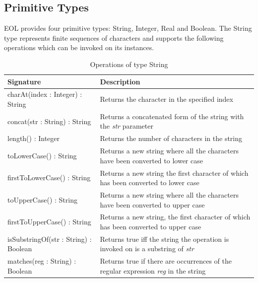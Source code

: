 \subsection{Primitive Types} 

EOL provides four primitive types: String, Integer, Real and Boolean. The String type represents finite sequences of characters and supports the following operations which can be invoked on its instances.

\begin{longtable} {|p{5.5cm}|p{6.5cm}|}
			
			\caption{Operations of type String}
			\label{tab:StringOperations}\\
			
			\hline
							
			\textbf{Signature} & \textbf{Description} \\\hline
			
			charAt(index : Integer) : String & Returns the character in the specified index\\\hline
			
			concat(str : String) : String & Returns a concatenated form of the string with the \emph{str} parameter\\\hline

			length() : Integer & Returns the number of characters in the string \\\hline
						
			toLowerCase() : String & Returns a new string where all the characters have been converted to lower case\\\hline
			
			firstToLowerCase() : String & Returns a new string the first character of which has been converted to lower case \\\hline
			
			toUpperCase() : String & Returns a new string where all the characters have been converted to upper case\\\hline
			
			firstToUpperCase() : String & Returns a new string, the first character of which has been converted to upper case \\\hline
			
			isSubstringOf(str : String) : Boolean & Returns true iff the string the operation is invoked on is a substring of \emph{str} \\\hline
			
			matches(reg : String) : Boolean & Returns true if there are occurrences of the regular expression \emph{reg} in the string\\\hline
			

\end{longtable}
